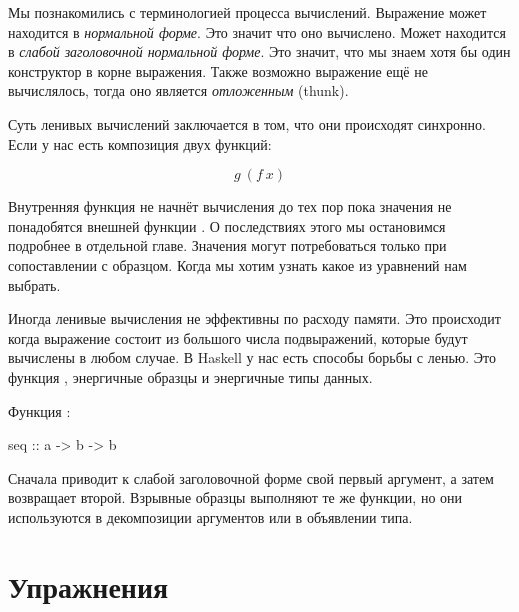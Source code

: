 Мы познакомились с терминологией процесса вычислений.
Выражение может находится в \emph{нормальной форме}. Это значит
что оно вычислено. Может находится в \emph{слабой заголовочной
нормальной форме}. Это значит, что мы знаем хотя бы один 
конструктор в корне выражения. Также возможно выражение 
ещё не вычислялось, тогда оно является \emph{отложенным} (thunk).

Суть ленивых вычислений заключается в том, что они
происходят синхронно. Если у нас есть 
композиция двух функций:

\[ g\ (f\ x) \]

Внутренняя функция  не начнёт вычисления до тех
пор пока значения не понадобятся внешней функции .
О последствиях этого мы остановимся подробнее в отдельной главе.
Значения могут потребоваться только при сопоставлении с образцом.
Когда мы хотим узнать какое из уравнений нам выбрать.

 Иногда ленивые вычисления не эффективны по расходу памяти. 
Это происходит когда выражение состоит из большого числа
подвыражений, которые будут вычислены в любом случае.
В Haskell у нас есть способы борьбы с ленью. 
Это функция , энергичные образцы и энергичные типы данных. 

Функция :

\begin{code}
seq :: a -> b -> b
\end{code}

Сначала приводит к слабой заголовочной форме свой первый
аргумент, а затем возвращает второй. Взрывные образцы
выполняют те же функции, но они используются в декомпозиции 
аргументов или в объявлении типа. 

\section{Упражнения}

